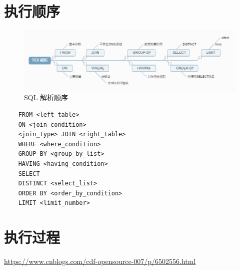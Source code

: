 \documentclass[UTF8,a4paper,12pt]{ctexbook}
\begin{document}
	
	\section{执行顺序}
		\begin{figure}[H]
			\centering
			\includegraphics[scale=.6]{sqlProcess}
			\caption{SQL 解析顺序}
		\end{figure}
		
		\begin{lstlisting}
	FROM <left_table>
	ON <join_condition>
	<join_type> JOIN <right_table>
	WHERE <where_condition>
	GROUP BY <group_by_list>
	HAVING <having_condition>
	SELECT 
	DISTINCT <select_list>
	ORDER BY <order_by_condition>
	LIMIT <limit_number>
		\end{lstlisting}
		
	\section{执行过程}
		\url{https://www.cnblogs.com/cdf-opensource-007/p/6502556.html}
		
\end{document}
